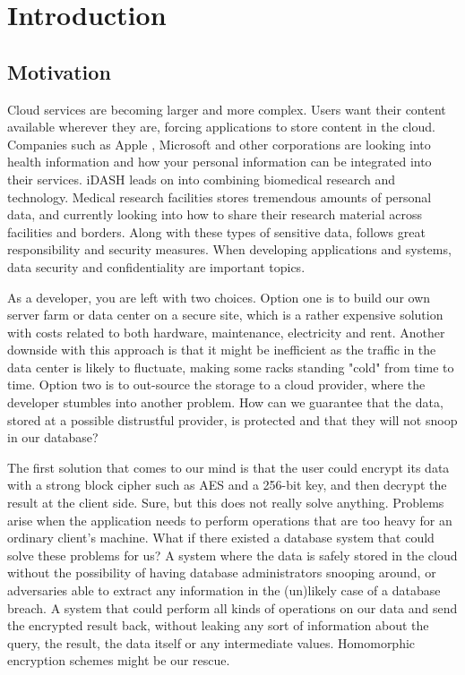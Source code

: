 \chapter{Introduction}
\label{chp:introduction}

\section{Motivation}

Cloud services are becoming larger and more complex. Users want their content available wherever they are, forcing applications to store content in the cloud. Companies such as Apple \cite{apple_health}, Microsoft \cite{microsoft_health} and other corporations are looking into health information and how your personal information can be integrated into their services. iDASH \cite{iDASH} leads on into combining biomedical research and technology.  Medical research facilities stores tremendous amounts of personal data, and currently looking into how to share their research material across facilities and borders. Along with these types of sensitive data, follows great responsibility and security measures. When developing applications and systems, data security and confidentiality are important topics.

As a developer, you are left with two choices. Option one is to build our own server farm or data center on a secure site, which is a rather expensive solution with costs related to both hardware, maintenance, electricity and rent. Another downside with this approach is that it might be inefficient as the traffic in the data center is likely to fluctuate, making some racks standing "cold" from time to time. Option two is to out-source the storage to a cloud provider, where the developer stumbles into another problem. How can we guarantee that the data, stored at a possible distrustful provider, is protected and that they will not snoop in our database?

The first solution that comes to our mind is that the user could encrypt its data with a strong block cipher such as AES and a 256-bit key, and then decrypt the result at the client side. Sure, but this does not really solve anything. Problems arise when the application needs to perform operations that are too heavy for an ordinary client's machine. What if there existed a database system that could solve these problems for us? A system where the data is safely stored in the cloud without the possibility of having database administrators snooping around, or adversaries able to extract any information in the (un)likely case of a database breach. A system that could perform all kinds of operations on our data and send the encrypted result back, without leaking any sort of information about the query, the result, the data itself or any intermediate values. Homomorphic encryption schemes might be our rescue.

